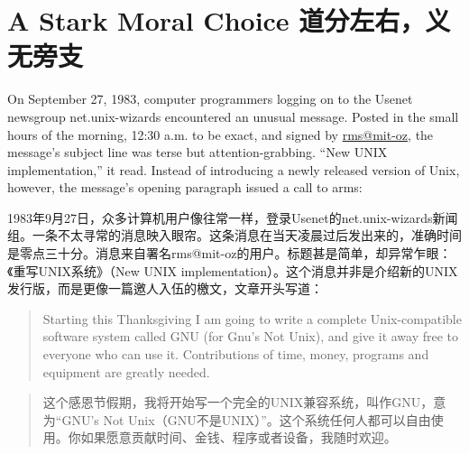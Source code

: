 \chapter{\ifdefined\eng
A Stark Moral Choice
\fi
\ifdefined\chs
道分左右，义无旁支
\fi}
\thispagestyle{empty}
\ifdefined\eng
On September 27, 1983, computer programmers logging on to the Usenet newsgroup net.unix-wizards encountered an unusual message. Posted in the small hours of the morning, 12:30 a.m. to be exact, and signed by \url{rms@mit-oz}, the message's subject line was terse but attention-grabbing. ``New UNIX implementation,'' it read. Instead of introducing a newly released version of Unix, however, the message's opening paragraph issued a call to arms:
\fi

\ifdefined\chs
1983年9月27日，众多计算机用户像往常一样，登录Usenet的net.unix-wizards新闻组。一条不太寻常的消息映入眼帘。这条消息在当天凌晨过后发出来的，准确时间是零点三十分。消息来自署名rms@mit-oz的用户。标题甚是简单，却异常乍眼：《重写UNIX系统》（New UNIX implementation）。这个消息并非是介绍新的UNIX发行版，而是更像一篇邀人入伍的檄文，文章开头写道：
\fi

\ifdefined\eng
\begin{quote}
Starting this Thanksgiving I am going to write a complete Unix-compatible software system called GNU (for Gnu's Not Unix), and give it away free to everyone who can use it. Contributions of time, money, programs and equipment are greatly needed.
\end{quote}
\fi

\ifdefined\chs
\begin{quote}
这个感恩节假期，我将开始写一个完全的UNIX兼容系统，叫作GNU，意为``GNU's Not Unix（GNU不是UNIX）''。这个系统任何人都可以自由使用。你如果愿意贡献时间、金钱、程序或者设备，我随时欢迎。
\end{quote}
\fi

